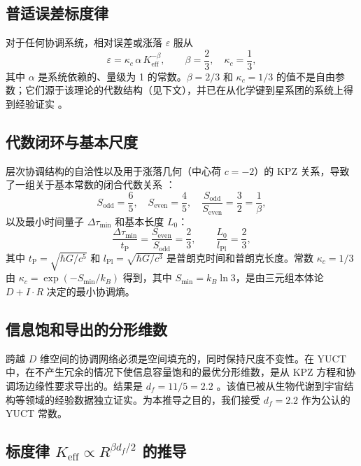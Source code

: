 \documentclass[11pt,a4paper]{article}
\newcommand{\kappac}{\kappa_c}
\newcommand{\Keff}{K_{\mathrm{eff}}}
\newcommand{\betaf}{\beta}
\newcommand{\Lpl}{l_{\mathrm{Pl}}}
\newcommand{\tP}{t_{\mathrm{P}}}
\newcommand{\Sodd}{S_{\mathrm{odd}}}
\newcommand{\Seven}{S_{\mathrm{even}}}
\newcommand{\Dtau}{\Delta\tau_{\min}}
\newcommand{\Lzero}{L_0}
\begin{document}
	\subsection{普适误差标度律}
	
	对于任何协调系统，相对误差或涨落 \(\varepsilon\) 服从
	\begin{equation}
		\varepsilon = \kappac \, \alpha \, \Keff^{-\betaf}, \qquad \betaf = \frac{2}{3}, \quad \kappac = \frac{1}{3},
		\label{eq:universal}
	\end{equation}
	其中 \(\alpha\) 是系统依赖的、量级为 1 的常数。\(\betaf = 2/3\) 和 \(\kappac = 1/3\) 的值不是自由参数；它们源于该理论的代数结构（见下文），并已在从化学键到星系团的系统上得到经验证实 \cite{AppendixL}。
	
	\subsection{代数闭环与基本尺度}
	
	层次协调结构的自洽性以及用于涨落几何（中心荷 \(c=-2\)）的 KPZ 关系，导致了一组关于基本常数的闭合代数关系 \cite{AppendixY}：
	\begin{equation}
		\Sodd = \frac{6}{5},\quad \Seven = \frac{4}{5},\quad \frac{\Sodd}{\Seven} = \frac{3}{2} = \frac{1}{\betaf},
	\end{equation}
	以及最小时间量子 \(\Dtau\) 和基本长度 \(\Lzero\)：
	\begin{equation}
		\frac{\Dtau}{\tP} = \frac{\Seven}{\Sodd} = \frac{2}{3}, \qquad \frac{\Lzero}{\Lpl} = \frac{2}{3},
		\label{eq:algebraic-loop}
	\end{equation}
	其中 \(\tP = \sqrt{\hbar G / c^5}\) 和 \(\Lpl = \sqrt{\hbar G / c^3}\) 是普朗克时间和普朗克长度。常数 \(\kappac = 1/3\) 由 \(\kappac = \exp(-S_{\min}/k_B)\) 得到，其中 \(S_{\min} = k_B \ln 3\)，是由三元组本体论 \(D + I \cdot R\) 决定的最小协调熵。
	
	\subsection{信息饱和导出的分形维数}
	
	跨越 \(D\) 维空间的协调网络必须是空间填充的，同时保持尺度不变性。在 YUCT 中，在不产生冗余的情况下使信息容量饱和的最优分形维数，是从 KPZ 方程和协调场边缘性要求导出的。结果是 \(d_f = 11/5 = 2.2\) \cite{AppendixL}。该值已被从生物代谢到宇宙结构等领域的经验数据独立证实。为本推导之目的，我们接受 \(d_f = 2.2\) 作为公认的 YUCT 常数。
	
	\subsection{标度律 \(\Keff \propto R^{\beta d_f/2}\) 的推导}
	
\end{document}
